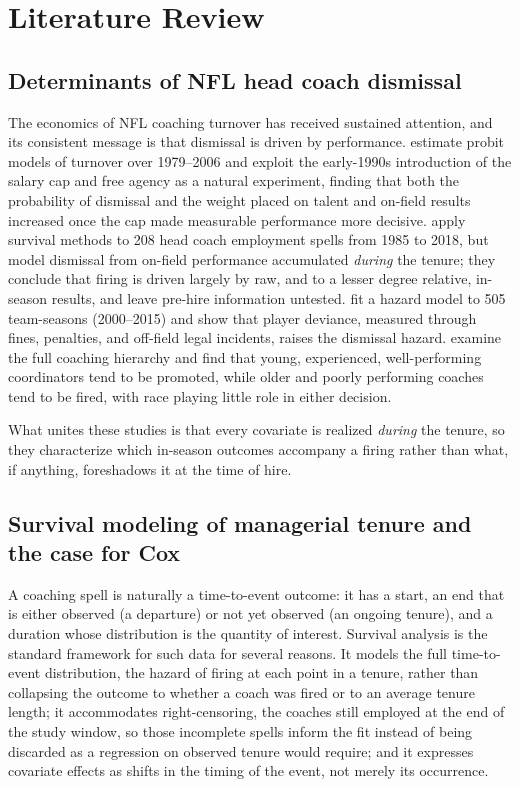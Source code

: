 \documentclass[USenglish]{article}
\theoremstyle{dgthm}
\theoremstyle{dgdef}
\begin{document}
\section{Literature Review}
\label{sec:litreview}

\subsection{Determinants of NFL head coach dismissal}

The economics of NFL coaching turnover has received sustained attention, and its consistent message is that dismissal is driven by performance. \citet{allen2012} estimate probit models of turnover over 1979--2006 and exploit the early-1990s introduction of the salary cap and free agency as a natural experiment, finding that both the probability of dismissal and the weight placed on talent and on-field results increased once the cap made measurable performance more decisive. \citet{salaga2020} apply survival methods to 208 head coach employment spells from 1985 to 2018, but model dismissal from on-field performance accumulated \emph{during} the tenure; they conclude that firing is driven largely by raw, and to a lesser degree relative, in-season results, and leave pre-hire information untested. \citet{foreman2019} fit a hazard model to 505 team-seasons (2000--2015) and show that player deviance, measured through fines, penalties, and off-field legal incidents, raises the dismissal hazard. \citet{farnell2021} examine the full coaching hierarchy and find that young, experienced, well-performing coordinators tend to be promoted, while older and poorly performing coaches tend to be fired, with race playing little role in either decision.

What unites these studies is that every covariate is realized \emph{during} the tenure, so they characterize which in-season outcomes accompany a firing rather than what, if anything, foreshadows it at the time of hire.

\subsection{Survival modeling of managerial tenure and the case for Cox}
\label{sec:litcox}

A coaching spell is naturally a time-to-event outcome: it has a start, an end that is either observed (a departure) or not yet observed (an ongoing tenure), and a duration whose distribution is the quantity of interest. Survival analysis is the standard framework for such data for several reasons. It models the full time-to-event distribution, the hazard of firing at each point in a tenure, rather than collapsing the outcome to whether a coach was fired or to an average tenure length; it accommodates right-censoring, the coaches still employed at the end of the study window, so those incomplete spells inform the fit instead of being discarded as a regression on observed tenure would require; and it expresses covariate effects as shifts in the timing of the event, not merely its occurrence.
\end{document}
